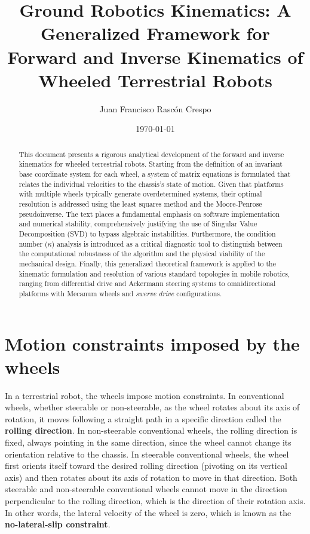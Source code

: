 \documentclass[11pt,a4paper]{article}
\title{Ground Robotics Kinematics: A Generalized Framework for Forward and Inverse Kinematics of Wheeled Terrestrial Robots}
\author{Juan Francisco Rascón Crespo}
\date{\today}
\begin{document}
\maketitle

\begin{abstract}
    This document presents a rigorous analytical development of the forward and inverse kinematics for wheeled terrestrial robots. Starting from the definition of an invariant base coordinate system for each wheel, a system of matrix equations is formulated that relates the individual velocities to the chassis's state of motion. Given that platforms with multiple wheels typically generate overdetermined systems, their optimal resolution is addressed using the least squares method and the Moore-Penrose pseudoinverse. The text places a fundamental emphasis on software implementation and numerical stability, comprehensively justifying the use of Singular Value Decomposition (SVD) to bypass algebraic instabilities. Furthermore, the condition number (\(\kappa\)) analysis is introduced as a critical diagnostic tool to distinguish between the computational robustness of the algorithm and the physical viability of the mechanical design. Finally, this generalized theoretical framework is applied to the kinematic formulation and resolution of various standard topologies in mobile robotics, ranging from differential drive and Ackermann steering systems to omnidirectional platforms with Mecanum wheels and \textit{swerve drive} configurations.
\end{abstract}

\section{Motion constraints imposed by the wheels}

In a terrestrial robot, the wheels impose motion constraints. In conventional wheels, whether steerable or non-steerable, as the wheel rotates about its axis of rotation, it moves following a straight path in a specific direction called the \textbf{rolling direction}. In non-steerable conventional wheels, the rolling direction is fixed, always pointing in the same direction, since the wheel cannot change its orientation relative to the chassis. In steerable conventional wheels, the wheel first orients itself toward the desired rolling direction (pivoting on its vertical axis) and then rotates about its axis of rotation to move in that direction. Both steerable and non-steerable conventional wheels cannot move in the direction perpendicular to the rolling direction, which is the direction of their rotation axis. In other words, the lateral velocity of the wheel is zero, which is known as the \textbf{no-lateral-slip constraint}.
\end{document}
